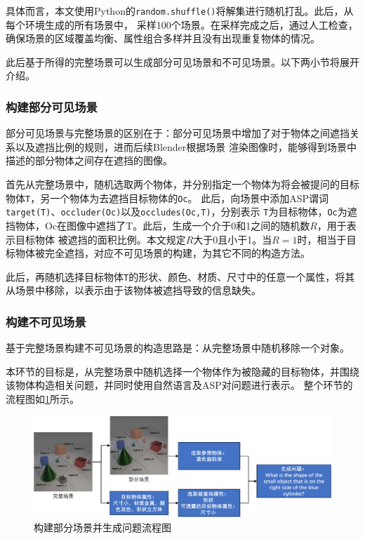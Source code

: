 \begin{enumerate}[nosep]
具体而言，本文使用Python的\texttt{random.shuffle()}将解集进行随机打乱。此后，从每个环境生成的所有场景中，
采样100个场景。在采样完成之后，通过人工检查，确保场景的区域覆盖均衡、属性组合多样并且没有出现重复物体的情况。
\end{enumerate}

此后基于所得的完整场景可以生成部分可见场景和不可见场景。以下两小节将展开介绍。
\subsubsection{构建部分可见场景}
部分可见场景与完整场景的区别在于：部分可见场景中增加了对于物体之间遮挡关系以及遮挡比例的规则，进而后续Blender根据场景
渲染图像时，能够得到场景中描述的部分物体之间存在遮挡的图像。

首先从完整场景中，随机选取两个物体，并分别指定一个物体为将会被提问的目标物体\texttt{T}，另一个物体为去遮挡目标物体的\texttt{Oc}。
此后，向场景中添加ASP谓词\texttt{target(T)}、\texttt{occluder(Oc)}以及\texttt{occludes(Oc,T)}，分别表示
\texttt{T}为目标物体，\texttt{Oc}为遮挡物体，Oc在图像中遮挡了T。此后，生成一个介于0和1之间的随机数$R$，用于表示目标物体
被遮挡的面积比例。本文规定$R$大于0且小于1。当$R=1$时，相当于目标物体被完全遮挡，对应不可见场景的构建，为其它不同的构造方法。

此后，再随机选择目标物体\texttt{T}的形状、颜色、材质、尺寸中的任意一个属性，将其从场景中移除，以表示由于该物体被遮挡导致的信息缺失。
\subsubsection{构建不可见场景}
基于完整场景构建不可见场景的构造思路是：从完整场景中随机移除一个对象。

本环节的目标是，从完整场景中随机选择一个物体作为被隐藏的目标物体，并围绕该物体构造相关问题，并同时使用自然语言及ASP对问题进行表示。
整个环节的流程图如\ref{generate-partial-scenes-and-questions}所示。
\begin{figure}[h]
\centering
\includegraphics[scale=0.6]{figures/部分场景及问题生成-crop.pdf}
\caption{构建部分场景并生成问题流程图}
\label{generate-partial-scenes-and-questions}
\end{figure}

